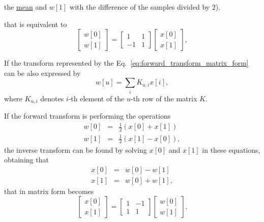 the
\href{https://en.wikipedia.org/wiki/Arithmetic_mean}{mean} and $w[1]$
with the difference of the samples divided by $2$).

that is equivalent to
\begin{equation*}
  \begin{bmatrix}
    w[0] \\
    w[1]
  \end{bmatrix}
  = 
  \begin{bmatrix} 1 & 1 \\ -1 & 1 \end{bmatrix}
  \begin{bmatrix}
    x[0] \\
    x[1]
  \end{bmatrix},
\end{equation*}


If the transform represented by the Eq.~\ref{eq:forward_transform_matrix_form} can be
also expressed by
\begin{equation}
  w[u] = \sum_i K_{u,i}x[i],
  \label{eq:forward_transform_linear_combination_form}
\end{equation}
where $K_{u,i}$ denotes $i$-th element of the $u$-th row of the matrix
$K$.

If the forward transform is performing the operations
\begin{equation*}
  \begin{array}{rcl}
  w[0] & = & \frac{1}{2}(x[0] + x[1])\\
  w[1] & = & \frac{1}{2}(x[1] - x[0]),
  \end{array}
\end{equation*}
the inverse transform can be found by solving $x[0]$ and $x[1]$ in
these equations, obtaining that
\begin{equation*}
  \begin{array}{rcl}
  x[0] & = & w[0] - w[1]\\
  x[1] & = & w[0] + w[1],
  \end{array}
\end{equation*}
that in matrix form becomes
\begin{equation*}
  \begin{bmatrix}
    x[0] \\
    x[1]
  \end{bmatrix}
  = 
  \begin{bmatrix} 1 & -1 \\ 1 & 1 \end{bmatrix}
  \begin{bmatrix}
    w[0] \\
    w[1]
  \end{bmatrix}.
\end{equation*}

